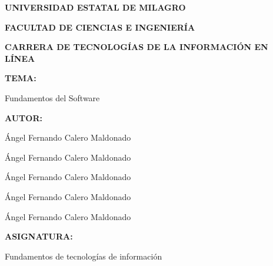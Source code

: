 \documentclass[12pt,a4paper]{article}
\begin{document}
	\begin{center}
		\singlespacing
		
		\vspace*{1cm}
		
		{\fontsize{24}{1}\selectfont\bfseries UNIVERSIDAD ESTATAL DE MILAGRO\par}
		\vspace{0.5cm}
		
		{\fontsize{20}{15}\selectfont\bfseries FACULTAD DE CIENCIAS E INGENIERÍA\par}
		\vspace{0.5cm}
		
		{\fontsize{18}{15}\selectfont\bfseries CARRERA DE TECNOLOGÍAS DE LA INFORMACIÓN EN LÍNEA\par}
		
		\vspace{1.5cm}
		
		{\fontsize{13}{15}\selectfont\bfseries TEMA:\par}
		\vspace{0.2cm}
		{\fontsize{13}{15}\selectfont Fundamentos del Software\par}
		
		\vspace{1cm}
		
		{\fontsize{13}{15}\selectfont\bfseries AUTOR:\par}
		\vspace{0.2cm}
		{\fontsize{13}{15}\selectfont Ángel Fernando Calero Maldonado\par}
		\vspace{0.2cm}
		{\fontsize{13}{15}\selectfont Ángel Fernando Calero Maldonado\par}
		\vspace{0.2cm}
		{\fontsize{13}{15}\selectfont Ángel Fernando Calero Maldonado\par}
		\vspace{0.2cm}
		{\fontsize{13}{15}\selectfont Ángel Fernando Calero Maldonado\par}
		\vspace{0.2cm}
		{\fontsize{13}{15}\selectfont Ángel Fernando Calero Maldonado\par}
		
		\vspace{1cm}
		
		{\fontsize{13}{15}\selectfont\bfseries ASIGNATURA:\par}
		\vspace{0.2cm}
		{\fontsize{13}{15}\selectfont Fundamentos de tecnologías de información\par}
		

\end{center}
\end{document}
